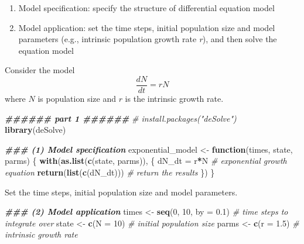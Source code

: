 \documentclass[
]{book}
\newenvironment{Shaded}{\begin{snugshade}}{\end{snugshade}}
\newcommand{\AttributeTok}[1]{\textcolor[rgb]{0.13,0.29,0.53}{#1}}
\newcommand{\CommentTok}[1]{\textcolor[rgb]{0.56,0.35,0.01}{\textit{#1}}}
\newcommand{\ControlFlowTok}[1]{\textcolor[rgb]{0.13,0.29,0.53}{\textbf{#1}}}
\newcommand{\DecValTok}[1]{\textcolor[rgb]{0.00,0.00,0.81}{#1}}
\newcommand{\DocumentationTok}[1]{\textcolor[rgb]{0.56,0.35,0.01}{\textbf{\textit{#1}}}}
\newcommand{\FloatTok}[1]{\textcolor[rgb]{0.00,0.00,0.81}{#1}}
\newcommand{\FunctionTok}[1]{\textcolor[rgb]{0.13,0.29,0.53}{\textbf{#1}}}
\newcommand{\NormalTok}[1]{#1}
\newcommand{\OtherTok}[1]{\textcolor[rgb]{0.56,0.35,0.01}{#1}}
\newcommand{\SpecialCharTok}[1]{\textcolor[rgb]{0.81,0.36,0.00}{\textbf{#1}}}
\begin{document}
\begin{enumerate}
\def\labelenumi{(\arabic{enumi})}
\item
  Model specification: specify the structure of differential equation model
\item
  Model application: set the time steps, initial population size and model parameters (e.g., intrinsic population growth rate \emph{r}), and then solve the equation model
\end{enumerate}

Consider the model
\[
\frac{dN}{dt} = rN
\]
where \(N\) is population size and \(r\) is the intrinsic growth rate.

\begin{Shaded}
\begin{Highlighting}[]
\DocumentationTok{\#\#\#\#\#\# part 1 \#\#\#\#\#\#}
\CommentTok{\# install.packages("deSolve")}
\FunctionTok{library}\NormalTok{(deSolve)}

\DocumentationTok{\#\#\# (1) Model specification}
\NormalTok{exponential\_model }\OtherTok{\textless{}{-}} \ControlFlowTok{function}\NormalTok{(times, state, parms) \{}
  \FunctionTok{with}\NormalTok{(}\FunctionTok{as.list}\NormalTok{(}\FunctionTok{c}\NormalTok{(state, parms)), \{}
\NormalTok{    dN\_dt }\OtherTok{=}\NormalTok{ r}\SpecialCharTok{*}\NormalTok{N  }\CommentTok{\# exponential growth equation}
    \FunctionTok{return}\NormalTok{(}\FunctionTok{list}\NormalTok{(}\FunctionTok{c}\NormalTok{(dN\_dt)))  }\CommentTok{\# return the results}
\NormalTok{  \})}
\NormalTok{\}}
\end{Highlighting}
\end{Shaded}

Set the time steps, initial population size and model parameters.

\begin{Shaded}
\begin{Highlighting}[]
\DocumentationTok{\#\#\# (2) Model application}
\NormalTok{times }\OtherTok{\textless{}{-}} \FunctionTok{seq}\NormalTok{(}\DecValTok{0}\NormalTok{, }\DecValTok{10}\NormalTok{, }\AttributeTok{by =} \FloatTok{0.1}\NormalTok{)  }\CommentTok{\# time steps to integrate over}
\NormalTok{state }\OtherTok{\textless{}{-}} \FunctionTok{c}\NormalTok{(}\AttributeTok{N =} \DecValTok{10}\NormalTok{)  }\CommentTok{\# initial population size}
\NormalTok{parms }\OtherTok{\textless{}{-}} \FunctionTok{c}\NormalTok{(}\AttributeTok{r =} \FloatTok{1.5}\NormalTok{)  }\CommentTok{\# intrinsic growth rate}
\end{Highlighting}
\end{Shaded}
\end{document}
